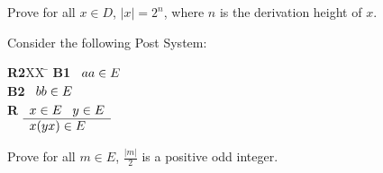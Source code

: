 \documentclass[]{exam}
\theoremstyle{definition}
\begin{document}
\begin{questions}
Prove for all $x \in D$, $|x| = 2^n$, where $n$ is the derivation height
of $x$. 

\question Consider the following Post System:
\begin{tabbing}
{\bf R2}XX \=  \kill
{\bf B1} \>
        \(\begin{array}[t]{l}
        aa \in E
        \end{array}\) \\[2ex]
{\bf B2} \>
        \(\begin{array}[t]{l}
        bb \in E
        \end{array}\) \\[2ex]
{\bf R} \>
        \(\begin{array}[t]{l}
        x \in E \;\;\;y \in E \\
        \hline
        x(yx) \in E
        \end{array}\) 
\end{tabbing}
Prove for all $m \in E$, $\frac{|m|}{2}$ is a positive odd integer.  

\end{questions}
\end{document}
